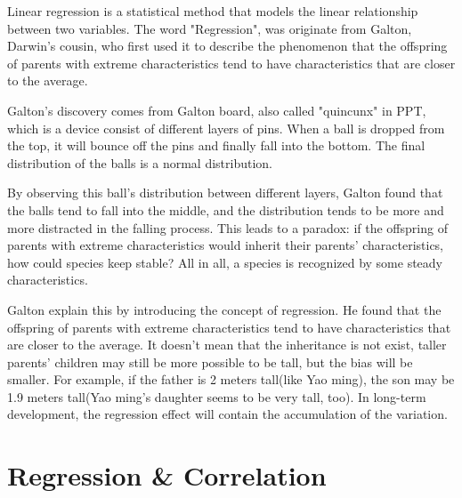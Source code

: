 \documentclass{article}
\begin{document}
Linear regression is a statistical method that models the linear relationship between two variables. The word "Regression", was originate from Galton, Darwin's cousin, who first used it to describe the phenomenon that the offspring of parents with extreme characteristics tend to have characteristics that are closer to the average. \par
Galton's discovery comes from Galton board, also called "quincunx" in PPT, which is a device consist of different layers of pins. When a ball is dropped from the top, it will bounce off the pins and finally fall into the bottom. The final distribution of the balls is a normal distribution.\par
By observing this ball's distribution between different layers, Galton found that the balls tend to fall into the middle, and the distribution tends to be more and more distracted in the falling process. This leads to a paradox: if the offspring of parents with extreme characteristics would inherit their parents' characteristics, how could species keep stable? All in all, a species is recognized by some steady characteristics. \par
Galton explain this by introducing the concept of regression. He found that the offspring of parents with extreme characteristics tend to have characteristics that are closer to the average. It doesn't mean that the inheritance is not exist, taller parents' children may still be more possible to be tall, but the bias will be smaller. For example, if the father is 2 meters tall(like Yao ming), the son may be 1.9 meters tall(Yao ming's daughter seems to be very tall, too). In long-term development, the regression effect will contain the accumulation of the variation. \par


\section{Regression \& Correlation}
\end{document}
